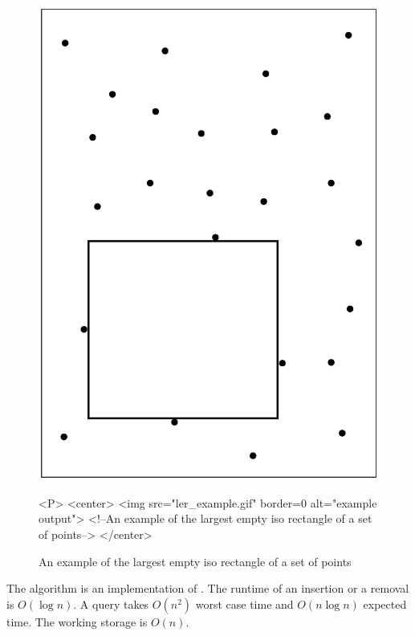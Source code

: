 \begin{figure}[h]
\begin{ccTexOnly}
    \centerline{
      \includegraphics{ler_example.ps}
    }
\end{ccTexOnly}

\caption{An example of the largest empty iso rectangle of a set of points
\label{fig:ler1}}

\begin{ccHtmlOnly}
    <P>
    <center>
        <img src="ler_example.gif"  border=0 alt="example output">
        <!--An example of the largest empty iso rectangle of a set of points-->
    </center>
\end{ccHtmlOnly}
\end{figure}

The algorithm is an implementation of \cite{o-naler-90}. The runtime of an
insertion or a removal is $O(\log n)$. A query takes $O(n^2)$ worst
case time and $O(n \log n)$ expected time. The working storage is $
O(n)$.


